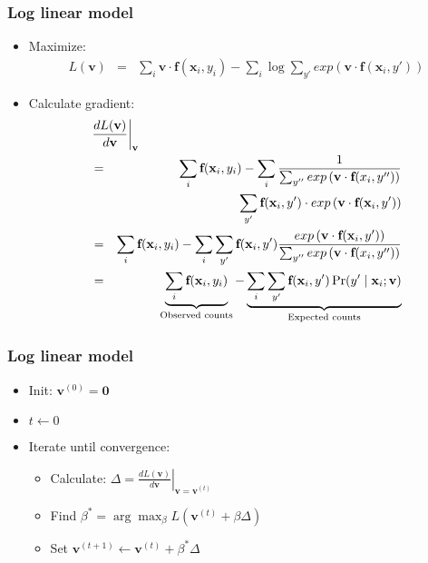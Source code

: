 \begin{frame}
\frametitle{Log linear model}
\begin{itemize}[<+->]
\item Maximize:
\begin{eqnarray*}
L(\textbf{v}) &=& \sum_i \textbf{v} \cdot \textbf{f}(\textbf{x}_i, y_i) - \sum_i \log \sum_{y'} exp\left( \textbf{v} \cdot \textbf{f}(\textbf{x}_i, y') \right) 
\end{eqnarray*}
\item Calculate gradient:
\begin{eqnarray*}
\lefteqn{\left. \frac{d L(\textbf{v})}{d \textbf{v}} \right|_{\textbf{v}} } \\
&=& \sum_i \textbf{f}(\textbf{x}_i, y_i) - \sum_i \frac{1}{\sum_{y''} exp\left(\textbf{v} \cdot \textbf{f}(x_i, y'')\right)} \\
&& \sum_{y'} \textbf{f}(\textbf{x}_i, y')  \cdot exp\left( \textbf{v} \cdot \textbf{f}(\textbf{x}_i, y') \right) \\
&=& \sum_i \textbf{f}(\textbf{x}_i, y_i) - \sum_i \sum_{y'} \textbf{f}(\textbf{x}_i, y') \frac{exp\left( \textbf{v} \cdot \textbf{f}(\textbf{x}_i, y') \right)}{\sum_{y''} exp\left(\textbf{v} \cdot \textbf{f}(x_i, y'')\right)} \\
&=& \underbrace{\sum_i \textbf{f}(\textbf{x}_i, y_i)}_{\textrm{Observed counts}} - \underbrace{\sum_i \sum_{y'} \textbf{f}(\textbf{x}_i, y') \Pr(y' \mid \textbf{x}_i; \textbf{v})}_{\textrm{Expected counts}}
\end{eqnarray*}
\end{itemize}
\end{frame}

\begin{frame}
\frametitle{Log linear model}
\begin{itemize}[<+->]
\item Init: $\textbf{v}^{(0)} = \textbf{0}$
\item $t \leftarrow 0$
\item Iterate until convergence:
\begin{itemize}[<+->]
\item Calculate: $\Delta = \left. \frac{d L(\textbf{v})}{d \textbf{v}}  \right|_{\textbf{v} = \textbf{v}^{(t)}}$
\item Find $\beta^\ast = \arg\max_\beta L(\textbf{v}^{(t)} + \beta \Delta)$
\item Set $\textbf{v}^{(t+1)} \leftarrow \textbf{v}^{(t)} + \beta^\ast \Delta$
\end{itemize}
\end{itemize}
\end{frame}

